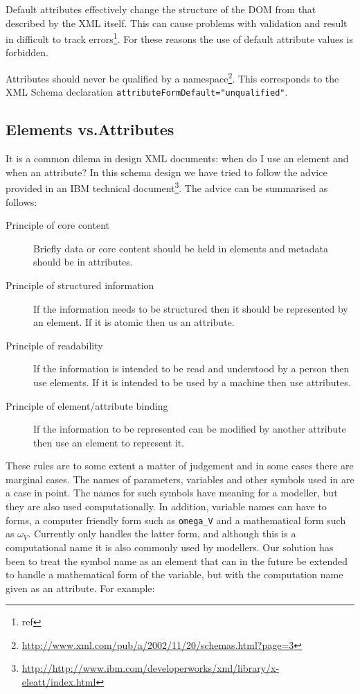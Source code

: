 Default attributes effectively change the structure of the DOM from
that described by the XML itself. This can cause problems with
validation and result in difficult to track
errors\footnote{ref}. For these reasons the use of default attribute
values is forbidden.

Attributes should never be qualified by a
namespace\footnote{\url{http://www.xml.com/pub/a/2002/11/20/schemas.html?page=3}}. This
corresponds to the XML Schema declaration
\verb|attributeFormDefault="unqualified"|.

\subsection{Elements vs.\@ Attributes}

It is a common dilema in design XML documents: when do I use an
element and when an attribute? In this schema design we have tried to
follow the advice provided in an IBM technical
document\footnote{\url{http://http://www.ibm.com/developerworks/xml/library/x-eleatt/index.html}}. The
advice can be summarised as follows:

\begin{description}
\item[Principle of core content] Briefly data or core content should
  be held in elements and metadata should be in attributes.
\item[Principle of structured information] If the information needs to
  be structured then it should be represented by an element. If it is
  atomic then us an attribute.
\item[Principle of readability] If the information is intended to be
  read and understood by a person then use elements. If it is intended
  to be used by a machine then use attributes.
\item[Principle of element/attribute binding] If the information to be
  represented can be modified by another attribute then use an element
  to represent it.
\end{description}

These rules are to some extent a matter of judgement and in some cases
there are marginal cases. The names of parameters, variables and other
symbols used in \pharmml are a case in point. The names for such
symbols have meaning for a modeller, but they are also used
computationally. In addition, variable names can have to forms, a
computer friendly form such as \texttt{omega\_V} and a mathematical
form such as $\omega_V$. Currently \pharmml only handles the latter
form, and although this is a computational name it is also commonly
used by modellers. Our solution has been to treat the symbol name as
an element that can in the future be extended to handle a mathematical
form of the variable, but with the computation name given as an
attribute. For example:

